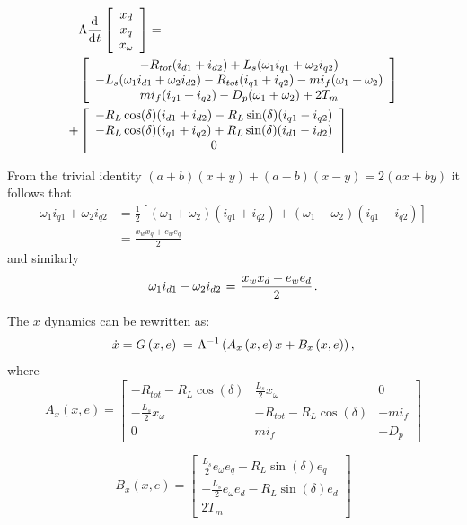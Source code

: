 \documentclass[letterpaper, 10 pt, conference]{ieeeconf}
\renewcommand{\o}    {{\omega}}
\newcommand{\half}   {{\frac{1}{2}}}
\newcommand{\m}      {{\hbox{\hskip 1pt}}}
\newcommand{\dd}     {{\rm d\hbox{\hskip 0.5pt}}}
\begin{document}
$$ \begin{aligned} &\Lambda\frac{\dd}{\dd t}\left[\begin{array}{c}
   x_{d}\\ x_{q}\\ x_{\o} \end{array}\right] = \\
   & \left[\begin{array}{c} - R_{tot}(i_{d1}+i_{d2})+L_s(\o_1 i_{q1}
   +\o_2 i_{q2})\\ -L_s(\o_1 i_{d1}+\o_2 i_{d2})-R_{tot}(i_{q1} +
   i_{q2})-m i_f(\o_1+\o_2)\\ m i_f(i_{q1}+i_{q2})-D_p(\o_1+\o_2) +
   2T_m \end{array}\right]\\ +& \left[ \begin{array}{c}
   -R_L\cos(\delta)(i_{d1}+i_{d2})-R_L\sin(\delta)(i_{q1}-i_{q2})\\
   -R_L\cos(\delta)(i_{q1}+i_{q2})+R_L\sin(\delta)(i_{d1}-i_{d2})\\
   0 \end{array}\right] \end{aligned}$$

From the trivial identity $(a+b)(x+y)+(a-b)(x-y)=2(ax+by)$ it 
follows that
$$ \begin{aligned} \o_1 i_{q1}+\o_2 i_{q2} &= \half\left[(\o_1+\o_2)
   (i_{q1}+i_{q2})+(\o_1-\o_2)(i_{q1}-i_{q2})\right]\\ & =\frac{x_{w}
   x_{q}+e_{w}e_{q}}{2} \end{aligned} $$
and similarly \vspace{-3mm}
$$ \o_1 i_{d1}-\o_2 i_{d2} \m=\m \frac{x_{w}x_{d}+e_{w}e_d}{2} \m.$$

The $x$ dynamics can be rewritten as:
$$ \dot{x}=G \left( x,e\right) \m=\m \Lambda^{-1}\left(A_x \left(x,e 
   \right) x + B_x \left( x,e\right) \right),$$
where
$$
A_x \left(x,e \right)=\left[\begin{array}{ccc}
-R_{tot}-R_{L}\cos(\delta) & \frac{L_{s}}{2}x_{\omega} & 0\\
-\frac{L_{s}}{2}x_{\omega} & -R_{tot}-R_{L}\cos(\delta) & -mi_f\\
0 & mi_{f} & -D_{p}
\end{array}\right]
$$

$$
B_x \left(x,e \right)=\left[\begin{array}{c}
\frac{L_{s}}{2}e_{\omega}e_{q}-R_{L}\sin(\delta)e_{q}\\
-\frac{L_{s}}{2}e_{\omega}e_{d}-R_{L}\sin(\delta)e_{d}\\
2T_{m}
\end{array}\right]
$$
\end{document}
